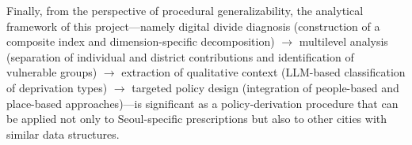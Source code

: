 Finally, from the perspective of procedural generalizability, the analytical framework of this project---namely digital divide diagnosis (construction of a composite index and dimension-specific decomposition) $\rightarrow$ multilevel analysis (separation of individual and district contributions and identification of vulnerable groups) $\rightarrow$ extraction of qualitative context (LLM-based classification of deprivation types) $\rightarrow$ targeted policy design (integration of people-based and place-based approaches)---is significant as a policy-derivation procedure that can be applied not only to Seoul-specific prescriptions but also to other cities with similar data structures.
